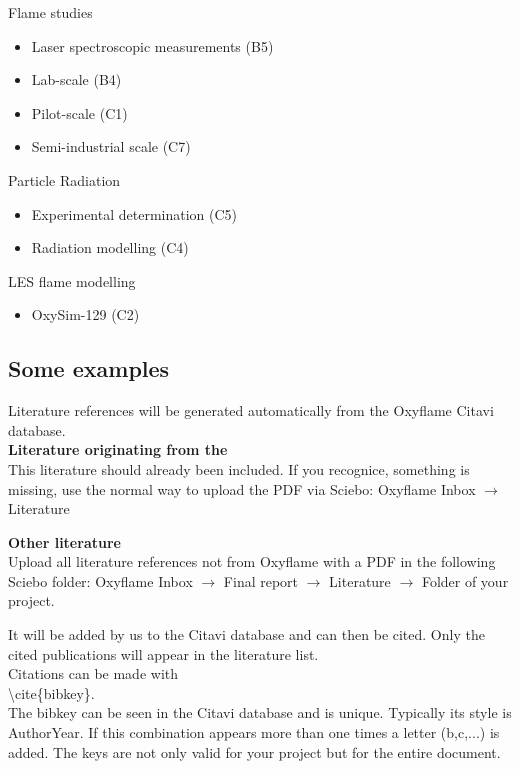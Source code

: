 \begin{btUnit}
Flame studies
\begin{itemize}
	\item Laser spectroscopic measurements (B5)
	\item Lab-scale (B4)    
	\item Pilot-scale (C1)
	\item Semi-industrial scale (C7)
\end{itemize}

Particle Radiation
\begin{itemize}
	\item Experimental determination (C5) 
	\item Radiation modelling (C4)	
\end{itemize}

LES flame modelling
\begin{itemize}
	\item OxySim-129 (C2)  	
\end{itemize}
\newpage

\subsection{Some examples}

Literature references will be generated automatically from the Oxyflame Citavi database.\\

\textbf{Literature originating from the \CRC}\\
This literature should already been included. If you recognice, something is missing, use the normal way to upload the PDF via Sciebo: Oxyflame Inbox $\rightarrow$ Literature

\textbf{Other literature}\\
Upload all literature references not from Oxyflame with a PDF in the following Sciebo folder:  Oxyflame Inbox $\rightarrow$ Final report $\rightarrow$ Literature $\rightarrow$ Folder of your project.

It will be added by us to the Citavi database and can then be cited. Only the cited publications will appear in the literature list.\\


Citations can be made with \\

\textbackslash cite\{bibkey\}. \\

The bibkey can be seen in the Citavi database and is unique. Typically its style is AuthorYear. If this combination appears more than one times a letter (b,c,...) is added. The keys are not only valid for your project but for the entire document.


\end{btUnit}
